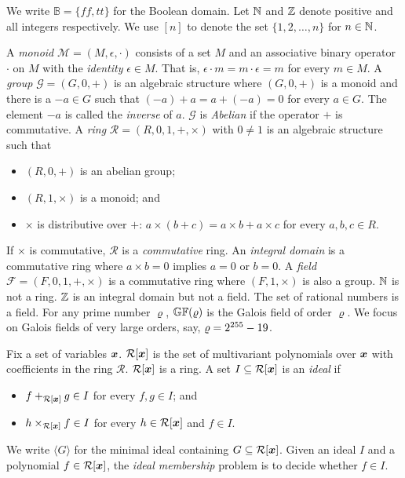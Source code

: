 
We write $\mathbb{B} = \{ \mathit{ff}, \mathit{tt} \}$ for the Boolean
domain. Let $\mathbb{N}$ and $\mathbb{Z}$ denote positive and all integers
respectively. We use $[n]$ to denote the set $\{ 1, 2, \ldots, n \}$
for $n \in \mathbb{N}$. 

A \emph{monoid} $\mathcal{M} = (M, \epsilon, \cdot)$ consists of a set
$M$ and an associative binary operator $\cdot$ on $M$ with the
\emph{identity} $\epsilon \in M$. That is, $\epsilon \cdot m = m \cdot
\epsilon = m$ for every $m \in M$.
A \emph{group} $\mathcal{G} = (G, 0, +)$ is an algebraic structure
where $(G, 0, +)$ is a monoid and there is a $-a \in G$ such that
$(-a) + a = a + (-a) = 0$ for every $a \in G$. The element $-a$ is
called the \emph{inverse} of $a$. $\mathcal{G}$ is \emph{Abelian} if
the operator $+$ is commutative.
A \emph{ring} $\mathcal{R} = (R, 0, 1, +, \times)$ with $0 \neq 1$ is
an algebraic structure such that
\begin{itemize}
\item $(R, 0, +)$ is an abelian group; 
\item $(R, 1, \times)$ is a monoid; and 
\item $\times$ is distributive over $+$: $a \times (b + c) = a \times
  b + a \times c$ for every $a, b, c \in R$.
\end{itemize}
If $\times$ is commutative, $\mathcal{R}$ is a \emph{commutative}
ring. An \emph{integral domain} is a commutative ring where $a \times
b = 0$ implies $a = 0$ or $b = 0$. A \emph{field} $\mathcal{F} = (F,
0, 1, +, \times)$ is a commutative ring where $(F, 1, \times)$ is also
a group. $\mathbb{N}$ is not a ring. $\mathbb{Z}$ is an integral domain but not
a field. The set of rational numbers is a field. 
For any prime number $\varrho$, $\mathbb{GF}(\varrho)$
is the Galois field of order $\varrho$. We focus on Galois fields of
very large orders, say, $\varrho = 2^{255} - 19$. 

Fix a set of variables $\vx$. $\mathcal{R}[\vx]$ is the set of
multivariant polynomials over $\vx$ with coefficients in the ring
$\mathcal{R}$. $\mathcal{R}[\vx]$ is a ring. A set $I \subseteq
\mathcal{R}[\vx]$ is an \emph{ideal} if 
\begin{itemize}
\item $f +_{\mathcal{R}[\vx]} g \in I$ for every $f, g \in I$; and
\item $h \times_{\mathcal{R[\vx]}} f \in I$ for every $h \in
  \mathcal{R}[\vx]$ and $f \in I$. 
\end{itemize}
We write $\langle G \rangle$ for the minimal ideal containing $G
\subseteq \mathcal{R}[\vx]$. Given an ideal $I$ and a polynomial $f \in
\mathcal{R}[\vx]$, the \emph{ideal membership} problem is to decide whether
$f \in I$.